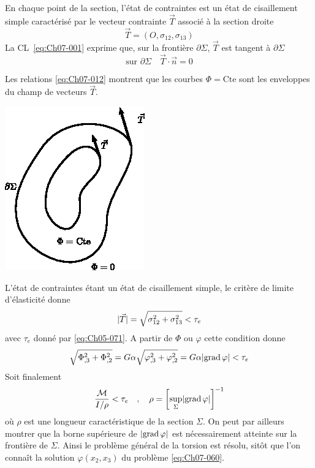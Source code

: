 En chaque point de la section, l'état de contraintes est un état de cisaillement simple caractérisé par le vecteur contrainte $\vec{T}$ associé à la section droite
\begin{equation}
    \vec{T} = \left( O, \sigma_{12}, \sigma_{13} \right)
    \label{eq:Ch07-065} 
\end{equation}
La CL~\eqref{eq:Ch07-001} exprime que, sur la frontière $\partial \Sigma$, $\vec{T}$ est tangent à $\partial \Sigma$ 
\begin{equation}
    \text{sur } \partial \Sigma \quad \vec{T} \cdot \vec{n} = 0    
    \label{eq:Ch07-066}
\end{equation}
\begin{multicols}{2}
    Les relations \eqref{eq:Ch07-012} montrent que les courbes $\Phi = \text{Cte}$ sont les enveloppes du champ de vecteurs $\vec{T}$.
    \columnbreak
    \begin{center}
        \includegraphics{../images/T1_Ch07-15}
    \end{center}
\end{multicols}

L'état de contraintes étant un état de cisaillement simple, le critère de limite d'élasticité donne 
\begin{equation}
    \lvert\vec{T}\rvert = \sqrt{\sigma_{12}^2 + \sigma_{13}^2} < \tau_e    
    \label{eq:Ch07-067}
\end{equation}
avec $\tau_e$ donné par \eqref{eq:Ch05-071}.
A partir de $\Phi$ ou $\varphi$ cette condition donne 
\[
\sqrt{\Phi_{,3}^2 + \Phi_{,2}^2} = G \alpha \sqrt{\varphi_{,3}^2 + \varphi_{,2}^2} = G \alpha \lvert\operatorname*{\mathrm{grad}} \varphi\rvert < \tau_e
\]
Soit finalement
\begin{equation}
    \frac{\mathcal{M}}{I/\rho} < \tau_e \quad , \quad \rho = \left[ \sup_{\Sigma} \lvert\operatorname*{\mathrm{grad}} \varphi\rvert \right]^{-1}
    \label{eq:Ch07-068}
\end{equation}
où $\rho$ est une longueur caractéristique de la section $\Sigma$.
On peut par ailleurs montrer que la borne supérieure de $\lvert\operatorname*{\mathrm{grad}} \varphi\rvert$ est nécessairement atteinte sur la frontière de $\Sigma$.
Ainsi le problème général de la torsion est résolu, sitôt que l'on connaît la solution $\varphi\left( x_2,x_3 \right)$ du problème \eqref{eq:Ch07-060}. 

